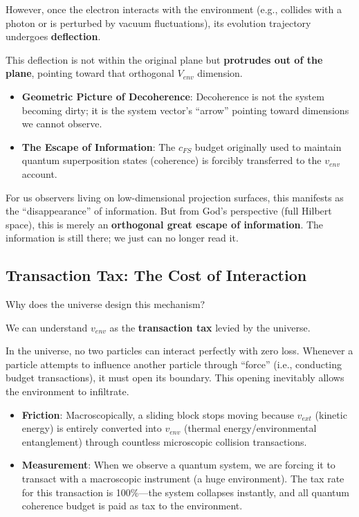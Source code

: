 However, once the electron interacts with the environment (e.g., collides with a photon or is perturbed by vacuum fluctuations), its evolution trajectory undergoes \textbf{deflection}.

This deflection is not within the original plane but \textbf{protrudes out of the plane}, pointing toward that orthogonal $V_{env}$ dimension.

\begin{itemize}
\item \textbf{Geometric Picture of Decoherence}: Decoherence is not the system becoming dirty; it is the system vector's ``arrow'' pointing toward dimensions we cannot observe.

\item \textbf{The Escape of Information}: The $c_{FS}$ budget originally used to maintain quantum superposition states (coherence) is forcibly transferred to the $v_{env}$ account.
\end{itemize}

For us observers living on low-dimensional projection surfaces, this manifests as the ``disappearance'' of information. But from God's perspective (full Hilbert space), this is merely an \textbf{orthogonal great escape of information}. The information is still there; we just can no longer read it.

\subsection{Transaction Tax: The Cost of Interaction}

Why does the universe design this mechanism?

We can understand $v_{env}$ as the \textbf{transaction tax} levied by the universe.

In the universe, no two particles can interact perfectly with zero loss. Whenever a particle attempts to influence another particle through ``force'' (i.e., conducting budget transactions), it must open its boundary. This opening inevitably allows the environment to infiltrate.

\begin{itemize}
\item \textbf{Friction}: Macroscopically, a sliding block stops moving because $v_{ext}$ (kinetic energy) is entirely converted into $v_{env}$ (thermal energy/environmental entanglement) through countless microscopic collision transactions.

\item \textbf{Measurement}: When we observe a quantum system, we are forcing it to transact with a macroscopic instrument (a huge environment). The tax rate for this transaction is 100\%---the system collapses instantly, and all quantum coherence budget is paid as tax to the environment.
\end{itemize}

